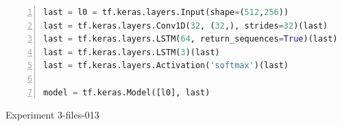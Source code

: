 

\noindent
\begin{algorithm}
\begin{lstlisting}[language=Python, frame=single, numbers=left]
last = l0 = tf.keras.layers.Input(shape=(512,256))
last = tf.keras.layers.Conv1D(32, (32,), strides=32)(last)
last = tf.keras.layers.LSTM(64, return_sequences=True)(last)
last = tf.keras.layers.LSTM(3)(last)
last = tf.keras.layers.Activation('softmax')(last)

model = tf.keras.Model([l0], last)
\end{lstlisting}
\caption{\label{alg:3-files-013}Experiment 3-files-013}
\end{algorithm}

